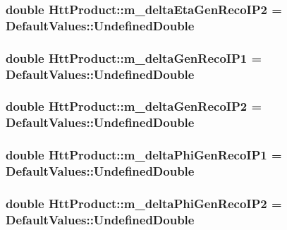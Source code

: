 \label{classHttProduct_aac726a3ccc8029923223bcd08e75f010}
\hypertarget{classHttProduct_a57bff061908d353a2f651657bd8e4de1}{
\subsubsection[{m\_\-deltaEtaGenRecoIP2}]{\setlength{\rightskip}{0pt plus 5cm}double {\bf HttProduct::m\_\-deltaEtaGenRecoIP2} = DefaultValues::UndefinedDouble}}
\label{classHttProduct_a57bff061908d353a2f651657bd8e4de1}
\hypertarget{classHttProduct_a3d4aa891d7628157d9aabe530a1b1c86}{
\subsubsection[{m\_\-deltaGenRecoIP1}]{\setlength{\rightskip}{0pt plus 5cm}double {\bf HttProduct::m\_\-deltaGenRecoIP1} = DefaultValues::UndefinedDouble}}
\label{classHttProduct_a3d4aa891d7628157d9aabe530a1b1c86}
\hypertarget{classHttProduct_a4ace48eb8ca08b83d4d7363639fa5dd5}{
\subsubsection[{m\_\-deltaGenRecoIP2}]{\setlength{\rightskip}{0pt plus 5cm}double {\bf HttProduct::m\_\-deltaGenRecoIP2} = DefaultValues::UndefinedDouble}}
\label{classHttProduct_a4ace48eb8ca08b83d4d7363639fa5dd5}
\hypertarget{classHttProduct_a4e55c66a5e3ec73aadb0a3917f727e7a}{
\subsubsection[{m\_\-deltaPhiGenRecoIP1}]{\setlength{\rightskip}{0pt plus 5cm}double {\bf HttProduct::m\_\-deltaPhiGenRecoIP1} = DefaultValues::UndefinedDouble}}
\label{classHttProduct_a4e55c66a5e3ec73aadb0a3917f727e7a}
\hypertarget{classHttProduct_a5bc17e1dd51ff83408e8cd70fc7b4d2d}{
\subsubsection[{m\_\-deltaPhiGenRecoIP2}]{\setlength{\rightskip}{0pt plus 5cm}double {\bf HttProduct::m\_\-deltaPhiGenRecoIP2} = DefaultValues::UndefinedDouble}}
